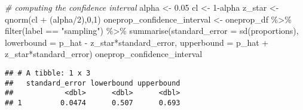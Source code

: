 \documentclass[
]{article}
\newenvironment{Shaded}{\begin{snugshade}}{\end{snugshade}}
\newcommand{\AttributeTok}[1]{\textcolor[rgb]{0.77,0.63,0.00}{#1}}
\newcommand{\CommentTok}[1]{\textcolor[rgb]{0.56,0.35,0.01}{\textit{#1}}}
\newcommand{\DecValTok}[1]{\textcolor[rgb]{0.00,0.00,0.81}{#1}}
\newcommand{\FloatTok}[1]{\textcolor[rgb]{0.00,0.00,0.81}{#1}}
\newcommand{\FunctionTok}[1]{\textcolor[rgb]{0.00,0.00,0.00}{#1}}
\newcommand{\NormalTok}[1]{#1}
\newcommand{\OtherTok}[1]{\textcolor[rgb]{0.56,0.35,0.01}{#1}}
\newcommand{\SpecialCharTok}[1]{\textcolor[rgb]{0.00,0.00,0.00}{#1}}
\newcommand{\StringTok}[1]{\textcolor[rgb]{0.31,0.60,0.02}{#1}}
\begin{document}
\begin{itemize}
\begin{Shaded}
\begin{Highlighting}[]
\CommentTok{\# computing the confidence interval}
\NormalTok{alpha }\OtherTok{\textless{}{-}} \FloatTok{0.05}
\NormalTok{cl }\OtherTok{\textless{}{-}} \DecValTok{1}\SpecialCharTok{{-}}\NormalTok{alpha}
\NormalTok{z\_star }\OtherTok{\textless{}{-}} \FunctionTok{qnorm}\NormalTok{(cl }\SpecialCharTok{+}\NormalTok{ (alpha}\SpecialCharTok{/}\DecValTok{2}\NormalTok{),}\DecValTok{0}\NormalTok{,}\DecValTok{1}\NormalTok{)}
\NormalTok{oneprop\_confidence\_interval }\OtherTok{\textless{}{-}}\NormalTok{ oneprop\_df }\SpecialCharTok{\%\textgreater{}\%}
  \FunctionTok{filter}\NormalTok{(label }\SpecialCharTok{==} \StringTok{"sampling"}\NormalTok{) }\SpecialCharTok{\%\textgreater{}\%}
  \FunctionTok{summarise}\NormalTok{(}\AttributeTok{standard\_error =} \FunctionTok{sd}\NormalTok{(proportions),}
            \AttributeTok{lowerbound =}\NormalTok{ p\_hat }\SpecialCharTok{{-}}\NormalTok{ z\_star}\SpecialCharTok{*}\NormalTok{standard\_error,}
            \AttributeTok{upperbound =}\NormalTok{ p\_hat }\SpecialCharTok{+}\NormalTok{ z\_star}\SpecialCharTok{*}\NormalTok{standard\_error)}
\NormalTok{oneprop\_confidence\_interval }
\end{Highlighting}
\end{Shaded}

\begin{verbatim}
## # A tibble: 1 x 3
##   standard_error lowerbound upperbound
##            <dbl>      <dbl>      <dbl>
## 1         0.0474      0.507      0.693
\end{verbatim}
\end{itemize}

\newpage
\end{document}
